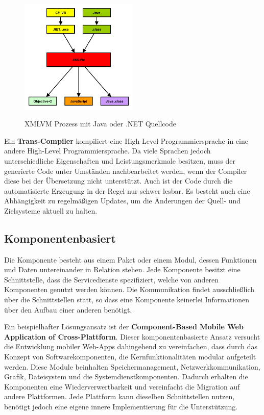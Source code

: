 \begin{figure}[htbp]
	\centering
	\includegraphics[width=0.5\textwidth]{Bilder/Compilation_Cross_XMLVM}
	\caption{XMLVM Prozess mit Java oder .NET Quellcode}\label{graph_compilation_XMLVM}\citep{XMLVM_Toolchain}
\end{figure}

\medskip
Ein \textbf{Trans-Compiler} kompiliert eine High-Level Programmiersprache in eine andere High-Level Programmiersprache. Da viele Sprachen jedoch unterschiedliche Eigenschaften und Leistungsmerkmale besitzen, muss der generierte Code unter Umständen nachbearbeitet werden, wenn der Compiler diese bei der Übersetzung nicht unterstützt. Auch ist der Code durch die automatisierte Erzeugung in der Regel nur schwer lesbar. Es besteht auch eine Abhängigkeit zu regelmäßigen Updates, um die Änderungen der Quell- und Zielsysteme aktuell zu halten.

\subsection{Komponentenbasiert}
Die Komponente besteht aus einem Paket oder einem Modul, dessen Funktionen und Daten untereinander in Relation stehen. Jede Komponente besitzt eine Schnittstelle, dass die Servicedienste spezifiziert, welche von anderen Komponenten genutzt werden können. Die Kommunikation findet ausschließlich über die Schnittstellen statt, so dass eine Komponente keinerlei Informationen über den Aufbau einer anderen benötigt. 

\medskip
Ein beispielhafter Lösungsansatz ist der \textbf{Component-Based Mobile Web Application of Cross-Plattform}. Dieser komponentenbasierte Ansatz versucht die Entwicklung mobiler Web-Apps dahingehend zu vereinfachen, dass durch das Konzept von Softwarekomponenten, die Kernfunktionalitäten modular aufgeteilt werden. Diese Module beinhalten Speichermanagement, Netzwerkkommunikation, Grafik, Dateisystem und die Systemdienstkomponenten. Dadurch erhalten die Komponenten eine Wiederverwertbarkeit und vereinfacht die Migration auf andere Plattformen. Jede Plattform kann dieselben Schnittstellen nutzen, benötigt jedoch eine eigene innere Implementierung für die Unterstützung. 


